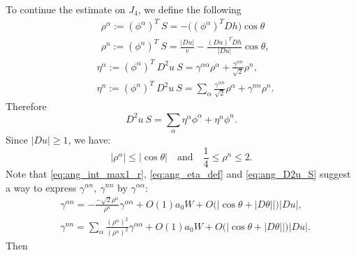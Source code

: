 \documentclass[12pt]{article}
\numberwithin{equation}{section}
\theoremstyle{plain}
\theoremstyle{definition}
\theoremstyle{remark}
\begin{document}
To continue the estimate on $J_4$, we define the following 
\begin{equation} \label{eq:ang_rho_def}
\begin{split}
    & \rho^{\alpha} := (\phi^{\alpha})^T \ S = -\big((\phi^\alpha)^TDh\big)\cos\theta \,\,\, \\
    &\rho^n := (\phi^n)^T \ S = 
    \frac{|Du|}{v} - \frac{(Du)^TDh}{|Du|}\cos\theta, 
\end{split}
\end{equation}
\begin{equation}  \label{eq:ang_eta_def}
\begin{split}
    & \eta^{\alpha} :=  (\phi^{\alpha})^T \  D^2 u \ S = \gamma^{\alpha \alpha} \rho^{\alpha} + \frac{\gamma^{\alpha n}}{\sqrt{2}} \rho^n, \\
    & \eta^n := (\phi^n)^T \  D^2 u \ S = \sum_{\alpha}  \frac{\gamma^{\alpha n}}{\sqrt{2}} \rho^{\alpha} + \gamma^{n n} \rho^n.
\end{split}
\end{equation}
Therefore
\begin{equation} \label{eq:ang_D2u_S}
    D^2 u \ S = \sum_{\alpha} \eta^{\alpha} \phi^{\alpha} + \eta^n \phi^n.
\end{equation}
Since $|Du| \geq 1$, we have:
\begin{equation}
    \left|\rho^{\alpha} \right| \leq | \cos{\theta}| \quad \text{and} \quad \frac{1}{4} \leq \rho^n \leq 2.
\end{equation}
Note that \eqref{eq:ang_int_max1_r}, \eqref{eq:ang_eta_def} and \eqref{eq:ang_D2u_S} suggest a way to express $\gamma^{\alpha n},\ \gamma^{n n}$ by $\gamma^{\alpha \alpha}$:
\begin{equation*}
\begin{split}
    & \gamma^{\alpha n} = - \frac{-\sqrt{2} \rho^{\alpha}}{\rho^n} \gamma^{\alpha \alpha} + O(1) a_0 W + O\big(|\cos{\theta} + |D\theta||\big) |Du|, \\
    & \gamma^{n n} = \sum_{\alpha} \frac{(\rho^{\alpha})^2}{(\rho^n)^2} \gamma^{\alpha \alpha} + O(1) a_0 W + O\big(|\cos{\theta} + |D\theta||\big) |Du|.
\end{split}
\end{equation*}
Then 
\end{document}
